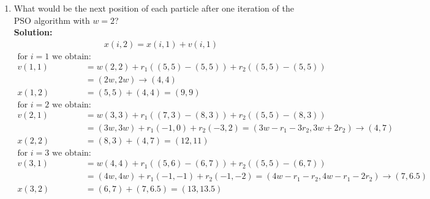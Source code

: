 \documentclass[a4paper]{article}
\begin{document}
\begin{enumerate}
\begin{enumerate}
	\item What would be the next position of each particle after one iteration of the PSO algorithm with $w = 2$?\\
	\textbf{Solution:}
	\begin{align*}
	    x(i, 2) = x(i, 1) + v(i, 1)
	\end{align*}
	\begin{align*}
	\text{for $i = 1$ we obtain:}\\
	    v(1,1) &= w(2,2) + r_1((5,5) - (5,5)) + r_2((5,5) - (5,5))\\
	           &= (2w,2w) \rightarrow (4,4)\\
	   x(1,2) &= (5,5) + (4,4) = (9,9)\\
	\text{for $i = 2$ we obtain:}\\
	    v(2,1) &= w(3,3) + r_1((7,3) - (8,3)) + r_2((5,5) - (8,3))\\
	           &= (3w,3w) + r_1(-1,0) + r_2(-3, 2) = (3w - r_1 - 3r_2, 3w + 2r_2) \rightarrow (4, 7)\\
	   x(2,2) &= (8,3) + (4,7) = (12, 11)\\
	\text{for $i = 3$ we obtain:}\\
	    v(3,1) &= w(4,4) + r_1((5,6) - (6,7)) + r_2((5,5) - (6,7))\\
	           &= (4w,4w) + r_1(-1,-1) + r_2(-1, -2) = (4w - r_1 - r_2, 4w - r_1 - 2r_2) \rightarrow (7, 6.5)\\
	   x(3,2) &= (6,7) + (7, 6.5) = (13, 13.5)
	\end{align*}
	

\end{enumerate}
\end{enumerate}
\end{document}
